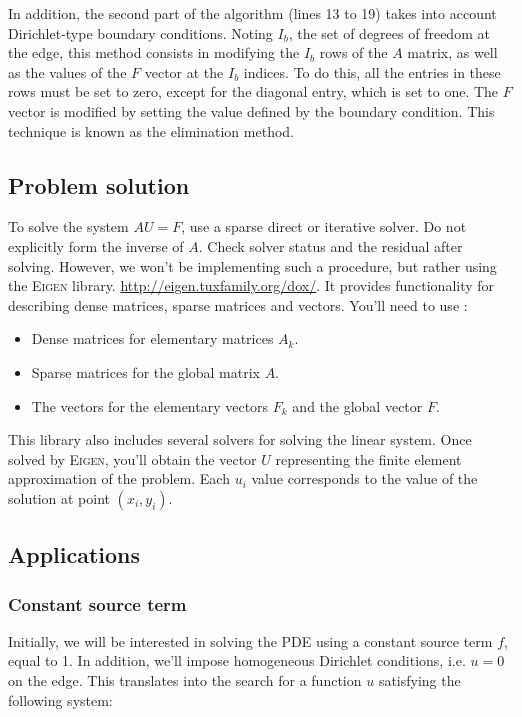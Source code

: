 \documentclass[11pt,a4paper]{article}
\begin{document}
In addition, the second part of the algorithm (lines 13 to 19) takes into account Dirichlet-type boundary conditions. Noting $I_b$, the set of degrees of freedom at the edge,
this method consists in modifying the $I_b$ rows of the $A$ matrix, as well as the values of the $F$ vector at the $I_b$ indices. To do this, all the entries in these rows must be set to zero, except for the diagonal entry, which is set to one.
The $F$ vector is modified by setting the value defined by the boundary condition. This technique is known as the elimination method.


\subsection{Problem solution}

To solve the system $A U = F$, use a sparse direct or iterative solver.
Do not explicitly form the inverse of $A$. Check solver status and the residual after solving.
However, we won't be implementing such a procedure, but rather using the \textsc{Eigen} library. \href{http://eigen.tuxfamily.org/dox/}{\color{shellpromptcolor} http://eigen.tuxfamily.org/dox/}.
It provides functionality for describing dense matrices, sparse matrices and vectors.
You'll need to use :
\begin{itemize}
\item Dense matrices for elementary matrices $A_k$.
\item Sparse matrices for the global matrix $A$.
\item The vectors for the elementary vectors $F_k$ and the global vector $F$.
\end{itemize}

This library also includes several solvers for solving the linear system.
Once solved by \textsc{Eigen}, you'll obtain the vector $U$ representing the finite element approximation of the problem.
Each $u_i$ value corresponds to the value of the solution at point $(x_i,y_i)$.

\subsection{Applications}

\subsubsection{Constant source term}

Initially, we will be interested in solving the PDE using a constant source term $f$, equal to 1.
In addition, we'll impose homogeneous Dirichlet conditions, i.e. $u=0$ on the edge.
This translates into the search for a function $u$ satisfying the following system:
\end{document}
